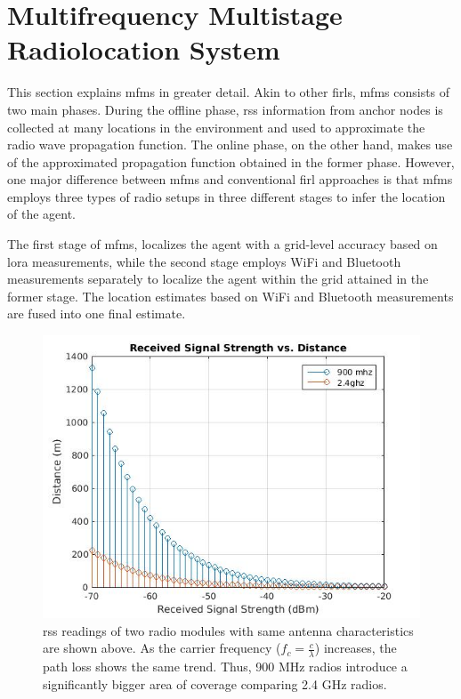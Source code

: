 \section{Multifrequency Multistage Radiolocation System}
\label{sec:mfms}
    This section explains \gls{mfms} in greater detail.
    Akin to other \gls{firl}s, \gls{mfms} consists of two main phases.
    During the offline phase, \gls{rss} information from anchor nodes is collected at many locations in the environment and used to approximate the radio wave propagation function.
    The online phase, on the other hand, makes use of the approximated propagation function obtained in the former phase.
    However, one major difference between \gls{mfms} and conventional \gls{firl} approaches is that \gls{mfms} employs three types of radio setups in three different stages to infer the location of the agent.

    The first stage of \gls{mfms}, localizes the agent with a grid-level accuracy based on \gls{lora} measurements, while the second stage employs WiFi and Bluetooth measurements separately to localize the agent within the grid attained in the former stage.
    The location estimates based on WiFi and Bluetooth measurements are fused into one final estimate.

    \begin{figure}[thpb]
        \centering
        \includegraphics[width=\linewidth]{figures/rss-vs-distance.jpg}
        \caption{\label{fig:log-distance}\gls{rss} readings of two radio modules with same antenna characteristics are shown above. As the carrier frequency ($f_c = \frac{c}{\lambda}$) increases, the path loss shows the same trend. Thus, 900 MHz radios introduce a significantly bigger area of coverage comparing 2.4 GHz radios.}
    \end{figure}

